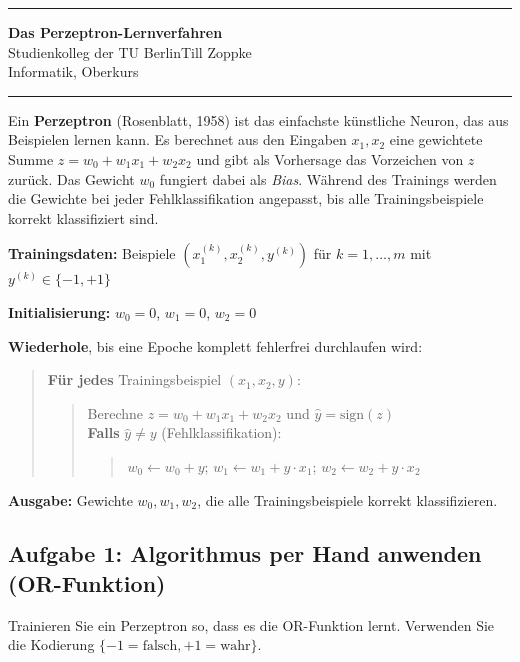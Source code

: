 \documentclass[ngerman,11pt]{article}
\begin{document}
\hrule
\begin{center}
{\large\bf Das Perzeptron-Lernverfahren}\\[-0mm]
Studienkolleg der TU Berlin\hfill Till Zoppke\\
Informatik, Oberkurs \hfill \DTMgermanmonthname{\month} \the\year\\[2mm]
\end{center}
\hrule
\bigskip

\noindent Ein \textbf{Perzeptron} (Rosenblatt, 1958) ist das einfachste künstliche Neuron, das aus Beispielen lernen kann. Es berechnet aus den Eingaben $x_1, x_2$ eine gewichtete Summe $z = w_0 + w_1 x_1 + w_2 x_2$ und gibt als Vorhersage das Vorzeichen von $z$ zurück. Das Gewicht $w_0$ fungiert dabei als \emph{Bias}. Während des Trainings werden die Gewichte bei jeder Fehlklassifikation angepasst, bis alle Trainingsbeispiele korrekt klassifiziert sind.

\begin{tcolorbox}[title=Der Perzeptron-Lernalgorithmus (Pseudocode)]
\textbf{Trainingsdaten:} Beispiele $(x_1^{(k)}, x_2^{(k)}, y^{(k)})$ für $k = 1, \ldots, m$ mit $y^{(k)} \in \{-1, +1\}$

\medskip
\textbf{Initialisierung:} $w_0 = 0$, $w_1 = 0$, $w_2 = 0$

\medskip
\textbf{Wiederhole}, bis eine Epoche komplett fehlerfrei durchlaufen wird:
\begin{quote}
\textbf{Für jedes} Trainingsbeispiel $(x_1, x_2, y)$:
\begin{quote}
Berechne $z = w_0 + w_1 x_1 + w_2 x_2$ und $\hat{y} = \text{sign}(z)$\\
\textbf{Falls} $\hat{y} \neq y$ \quad (Fehlklassifikation):
\begin{quote}
$w_0 \leftarrow w_0 + y$; \quad $w_1 \leftarrow w_1 + y \cdot x_1$; \quad $w_2 \leftarrow w_2 + y \cdot x_2$
\end{quote}
\end{quote}
\end{quote}

\medskip
\textbf{Ausgabe:} Gewichte $w_0, w_1, w_2$, die alle Trainingsbeispiele korrekt klassifizieren.
\end{tcolorbox}

\subsection*{Aufgabe 1: Algorithmus per Hand anwenden (OR-Funktion)}

\noindent Trainieren Sie ein Perzeptron so, dass es die OR-Funktion lernt. Verwenden Sie die Kodierung $\{-1 = \text{falsch}, +1 = \text{wahr}\}$.
\end{document}

